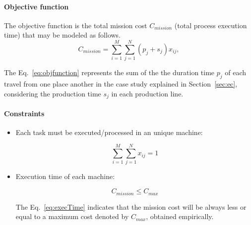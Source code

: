 \documentclass[conference,harvard,brazil,english]{sbatex}
\begin{document}
\paragraph{Objective function}

The objective function is the total mission cost $C_{mission}$ (total process execution time) that may be modeled as follows.
\begin{equation}
\label{eq:objfunction}
C_{mission}=\sum_{i=1}^{M}{\sum_{j=1}^{N}{
 (p_j+s_j)x_{ij}}},
\end{equation}

The Eq.~\eqref{eq:objfunction} represents the sum of the the duration time $p_j$ of each travel from one place another in the case study explained in Section~\ref{sec:ec}, considering the production time $s_j$ in each production line.




\paragraph{Constraints}

\begin{itemize}
\item Each task must be executed/processed in an unique machine:

\begin{equation}
\label{eq:unicity}
\sum_{i=1}^{M}{\sum_{j=1}^{N}{x_{ij}}}=1
\end{equation}

\item Execution time of each machine:

\begin{equation}
\label{eq:execTime}
C_{mission}\leq C_{max}
\end{equation}

The Eq.~\eqref{eq:execTime} indicates that the mission cost will be always less or equal to a maximum cost denoted by $C_{max}$, obtained empirically.
\end{itemize}

\end{document}
